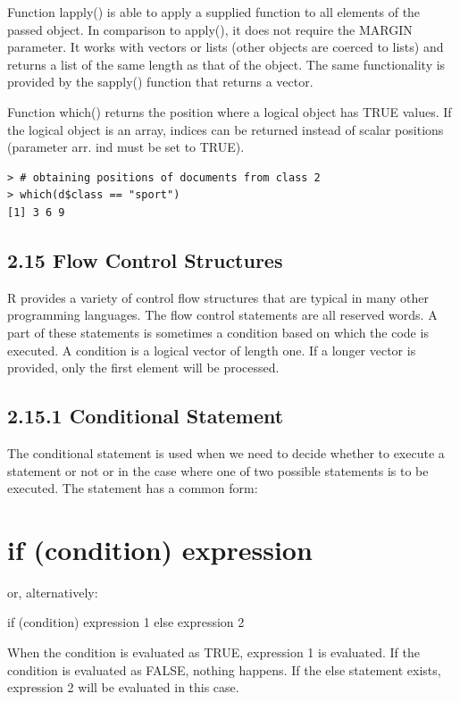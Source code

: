 \documentclass[10pt]{book}
\begin{document}
Function lapply() is able to apply a supplied function to all elements of the passed object. In comparison to apply(), it does not require the MARGIN parameter. It works with vectors or lists (other objects are coerced to lists) and returns a list of the same length as that of the object. The same functionality is provided by the sapply() function that returns a vector.

Function which() returns the position where a logical object has TRUE values. If the logical object is an array, indices can be returned instead of scalar positions (parameter arr. ind must be set to TRUE).

\begin{verbatim}
> # obtaining positions of documents from class 2
> which(d$class == "sport")
[1] 3 6 9
\end{verbatim}

\subsection*{2.15 Flow Control Structures}
R provides a variety of control flow structures that are typical in many other programming languages. The flow control statements are all reserved words. A part of these statements is sometimes a condition based on which the code is executed. A condition is a logical vector of length one. If a longer vector is provided, only the first element will be processed.

\subsection*{2.15.1 Conditional Statement}
The conditional statement is used when we need to decide whether to execute a statement or not or in the case where one of two possible statements is to be executed. The statement has a common form:

\section*{if (condition) expression}
or, alternatively:

\begin{displayquote}
if (condition) expression 1 else expression 2
\end{displayquote}

When the condition is evaluated as TRUE, expression 1 is evaluated. If the condition is evaluated as FALSE, nothing happens. If the else statement exists, expression 2 will be evaluated in this case.
\end{document}
